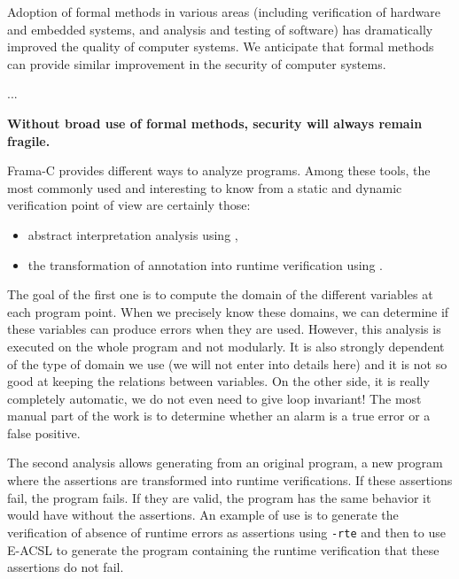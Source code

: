 \begin{Quotation}
Adoption of formal methods in various areas (including verification of hardware
and embedded systems, and analysis and testing of software) has dramatically
improved the quality of computer systems.  We anticipate that formal methods
can provide similar improvement in the security of computer systems.

...

\textbf{Without broad use of formal methods, security will always remain fragile.}
\end{Quotation}







Frama-C provides different ways to analyze programs. Among these tools, the
most commonly used and interesting to know from a static and dynamic
verification point of view are certainly those:
\begin{itemize}
\item abstract interpretation analysis using
,
\item the transformation of annotation into runtime verification using
.
\end{itemize}

The goal of the first one is to compute the domain of the different
variables at each program point. When we precisely know these domains,
we can determine if these variables can produce errors when they are
used. However, this analysis is executed on the whole program and not
modularly. It is also strongly dependent of the type of domain we use (we
will not enter into details here) and it is not so good at keeping the
relations between variables. On the other side, it is really completely
automatic, we do not even need to give loop invariant! The most manual
part of the work is to determine whether an alarm is a true error
or a false positive.

The second analysis allows generating from an original program, a new
program where the assertions are transformed into runtime verifications.
If these assertions fail, the program fails. If they are valid, the
program has the same behavior it would have without the assertions. An
example of use is to generate the verification of absence of runtime
errors as assertions using \texttt{-rte} and then to use E-ACSL to
generate the program containing the runtime verification that these
assertions do not fail.

